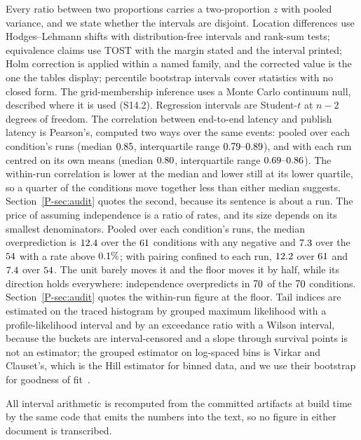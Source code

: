 \documentclass[10pt,journal,onecolumn]{IEEEtran}
\newcommand{\mainAudit}{\ref{P-sec:audit}}           %
\begin{document}
Every ratio between two proportions carries a
two-proportion $z$ with pooled variance, and we state whether the intervals are disjoint. Location differences use
Hodges--Lehmann shifts with distribution-free intervals and
rank-sum tests; equivalence claims use TOST with the margin
stated and the interval printed; Holm correction is applied within a named family,
and the corrected value is the one the tables display; percentile bootstrap intervals cover
statistics with no closed form. The grid-membership inference uses a Monte Carlo continuum null,
described where it is used (S14.2). Regression intervals are Student-$t$ at $n-2$ degrees of
freedom. The correlation between end-to-end latency and publish latency is Pearson's, computed two
ways over the same events: pooled over each condition's runs (median $0.85$,
interquartile range $\spanRhoIQR$), and with each run centred on its own means (median
$0.80$, interquartile range $\spanRhoWithinIQR$). The within-run correlation is
lower at the median and lower still at its lower quartile, so a quarter of the conditions move
together less than either median suggests. Section~\mainAudit{} quotes the
second, because its sentence is about a run. The price of assuming independence is a ratio of
rates, and its size depends on its smallest denominators. Pooled over each condition's runs, the
median overprediction is $12.4$ over the $61$ conditions with any
negative and $7.3$ over the $54$ with a rate above
$0.1\%$; with pairing confined to each run, $12.2$ over
$61$ and $7.4$ over $54$. The unit barely moves it
and the floor moves it by half, while its direction holds everywhere: independence overpredicts in
$70$ of the $70$ conditions. Section~\mainAudit{}
quotes the within-run figure at the floor. Tail indices are estimated on the traced histogram by grouped maximum likelihood
with a profile-likelihood interval and by an exceedance ratio with a Wilson interval,
because the buckets are interval-censored and a slope through survival points is not an
estimator; the grouped estimator on log-spaced bins is Virkar and Clauset's, which is the
Hill estimator for binned data, and we use their bootstrap for goodness of
fit~\cite{virkar2014power}.

All interval arithmetic is recomputed from the committed artifacts at build time by the same
code that emits the numbers into the text, so no figure in either document is transcribed.
\end{document}
